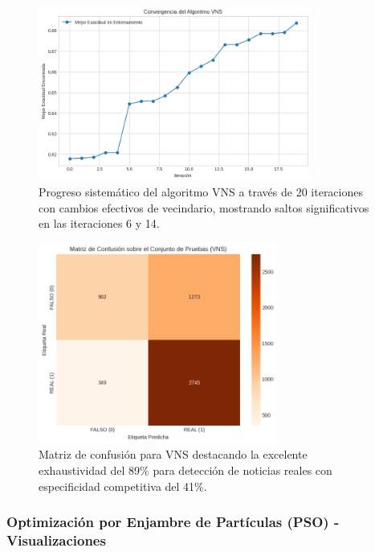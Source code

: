 \begin{figure}[h!]
    \centering
    \includegraphics[width=0.8\textwidth]{Imagenes/convergencia_vns.png}
    \caption{Progreso sistemático del algoritmo VNS a través de 20 iteraciones con cambios efectivos de vecindario, mostrando saltos significativos en las iteraciones 6 y 14.}
    \label{fig:convergencia_vns}
\end{figure}

\begin{figure}[h!]
    \centering
    \includegraphics[width=0.7\textwidth]{Imagenes/matriz_confusion_vns.png}
    \caption{Matriz de confusión para VNS destacando la excelente exhaustividad del 89\% para detección de noticias reales con especificidad competitiva del 41\%.}
    \label{fig:matriz_vns}
\end{figure}

\newpage

\subsubsection{Optimización por Enjambre de Partículas (PSO) - Visualizaciones}

